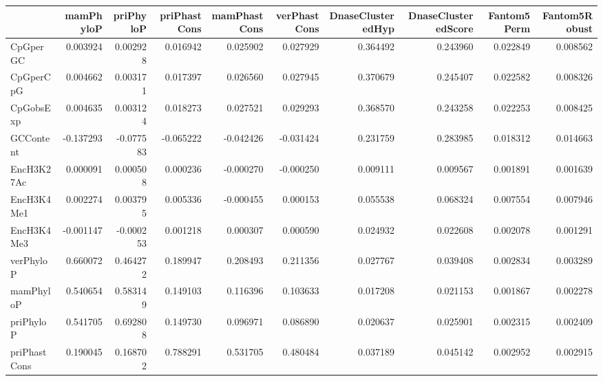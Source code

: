 \begin{tabular}{lrrrrrrrrr}
\toprule
{} &  mamPhyloP &  priPhyloP &  priPhastCons &  mamPhastCons &  verPhastCons &  DnaseClusteredHyp &  DnaseClusteredScore &  Fantom5Perm &  Fantom5Robust \\
\midrule
CpGperGC            &   0.003924 &   0.002928 &      0.016942 &      0.025902 &      0.027929 &           0.364492 &             0.243960 &     0.022849 &       0.008562 \\
CpGperCpG           &   0.004662 &   0.003171 &      0.017397 &      0.026560 &      0.027945 &           0.370679 &             0.245407 &     0.022582 &       0.008326 \\
CpGobsExp           &   0.004635 &   0.003124 &      0.018273 &      0.027521 &      0.029293 &           0.368570 &             0.243258 &     0.022253 &       0.008425 \\
GCContent           &  -0.137293 &  -0.077583 &     -0.065222 &     -0.042426 &     -0.031424 &           0.231759 &             0.283985 &     0.018312 &       0.014663 \\
EncH3K27Ac          &   0.000091 &   0.000508 &      0.000236 &     -0.000270 &     -0.000250 &           0.009111 &             0.009567 &     0.001891 &       0.001639 \\
EncH3K4Me1          &   0.002274 &   0.003795 &      0.005336 &     -0.000455 &      0.000153 &           0.055538 &             0.068324 &     0.007554 &       0.007946 \\
EncH3K4Me3          &  -0.001147 &  -0.000253 &      0.001218 &      0.000307 &      0.000590 &           0.024932 &             0.022608 &     0.002078 &       0.001291 \\
verPhyloP           &   0.660072 &   0.464272 &      0.189947 &      0.208493 &      0.211356 &           0.027767 &             0.039408 &     0.002834 &       0.003289 \\
mamPhyloP           &   0.540654 &   0.583149 &      0.149103 &      0.116396 &      0.103633 &           0.017208 &             0.021153 &     0.001867 &       0.002278 \\
priPhyloP           &   0.541705 &   0.692808 &      0.149730 &      0.096971 &      0.086890 &           0.020637 &             0.025901 &     0.002315 &       0.002409 \\
priPhastCons        &   0.190045 &   0.168702 &      0.788291 &      0.531705 &      0.480484 &           0.037189 &             0.045142 &     0.002952 &       0.002915 \\

\end{tabular}
